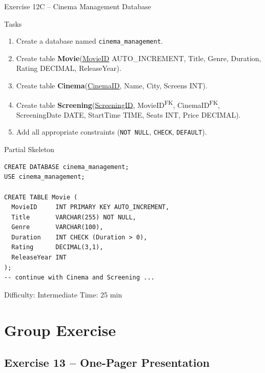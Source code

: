 \documentclass[10pt]{beamer}
\begin{document}
\begin{frame}[fragile]{Exercise 12C -- Cinema Management Database}
  \begin{block}{Tasks}
    \begin{enumerate}
      \item Create a database named \texttt{cinema\_management}.
      \item Create table \textbf{Movie}(\underline{MovieID} AUTO\_INCREMENT, Title, Genre, Duration, Rating DECIMAL, ReleaseYear).
      \item Create table \textbf{Cinema}(\underline{CinemaID}, Name, City, Screens INT).
      \item Create table \textbf{Screening}(\underline{ScreeningID}, MovieID\textsuperscript{FK}, CinemaID\textsuperscript{FK}, ScreeningDate DATE, StartTime TIME, Seats INT, Price DECIMAL).
      \item Add all appropriate constraints (\texttt{NOT NULL}, \texttt{CHECK}, \texttt{DEFAULT}).
    \end{enumerate}
  \end{block}

  \begin{block}{Partial Skeleton}
\begin{lstlisting}[style=sqlstyle]
CREATE DATABASE cinema_management;
USE cinema_management;

CREATE TABLE Movie (
  MovieID     INT PRIMARY KEY AUTO_INCREMENT,
  Title       VARCHAR(255) NOT NULL,
  Genre       VARCHAR(100),
  Duration    INT CHECK (Duration > 0),
  Rating      DECIMAL(3,1),
  ReleaseYear INT
);
-- continue with Cinema and Screening ...
\end{lstlisting}
  \end{block}

  \begin{alertblock}{Difficulty: Intermediate \quad Time: 25 min}
  \end{alertblock}
\end{frame}

\section{Group Exercise}

\subsection{Exercise 13 -- One-Pager Presentation}
\end{document}
